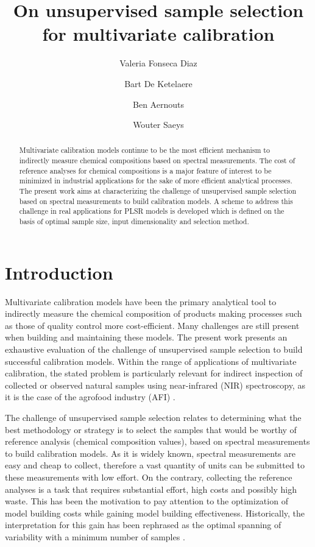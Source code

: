 \documentclass[journal=ancham,manuscript=article]{achemso}
\author{Valeria Fonseca Diaz}
\author{Bart De Ketelaere}
\author{Ben Aernouts}
\author{Wouter Saeys}
\affiliation[KU Leuven]
{KU Leuven, Kasteelpark
Arenberg 30, Leuven, Belgium}
\title[An \textsf{achemso} demo]
  {On unsupervised sample selection for multivariate calibration}
\begin{document}
\begin{abstract}
Multivariate calibration models continue to be the most efficient mechanism to indirectly measure chemical compositions based on spectral measurements. The cost of reference analyses for chemical compositions is a major feature of interest to be minimized in industrial applications for the sake of more efficient analytical processes. The present work aims at characterizing the challenge of unsupervised sample selection based on spectral measurements to build calibration models. A scheme to address this challenge in real applications for PLSR models is developed which is defined on the basis of optimal sample size, input dimensionality and selection method.
\end{abstract}%


\section{Introduction}\label{introduction}

Multivariate calibration models have been the primary analytical tool to indirectly measure the chemical composition of products making processes such as those of quality control more cost-efficient. Many challenges are still present when building and maintaining these models. The present work presents an exhaustive evaluation of the challenge of unsupervised sample selection to build successful calibration models. Within the range of applications of multivariate calibration, the stated problem is particularly relevant for indirect inspection of collected or observed natural samples using near-infrared (NIR) spectroscopy, as it is the case of the agrofood industry (AFI) \cite{Au2020,Diaz-Olivares2020, Saeys2005, Bobelyn2010}.  

The challenge of unsupervised sample selection relates to determining what the best methodology or strategy is to select the samples that would be worthy of reference analysis (chemical composition values), based on spectral measurements to build calibration models. As it is widely known, spectral measurements are easy and cheap to collect, therefore a vast quantity of units can be submitted to these measurements with low effort. On the contrary, collecting the reference analyses is a task that requires substantial effort, high costs and possibly high waste. This has been the motivation to pay attention to the optimization of model building costs while gaining model building effectiveness. Historically, the interpretation for this gain has been rephrased as the optimal spanning of variability with a minimum number of samples \cite{Naes1990, Saeys2019,Kennard1969}.
\end{document}
